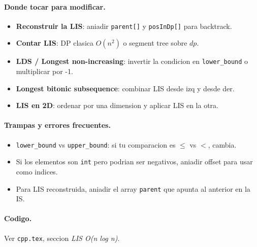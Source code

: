 \paragraph{Donde tocar para modificar.}
\begin{itemize}\setlength\itemsep{0pt}
	\item \textbf{Reconstruir la LIS}: aniadir \texttt{parent[]} y \texttt{posInDp[]} para backtrack.
	\item \textbf{Contar LIS}: DP clasica $O(n^2)$ o segment tree sobre $dp$.
	\item \textbf{LDS / Longest non-increasing}: invertir la condicion en \texttt{lower\_bound} o multiplicar por -1.
	\item \textbf{Longest bitonic subsequence}: combinar LIS desde izq y desde der.
	\item \textbf{LIS en 2D}: ordenar por una dimension y aplicar LIS en la otra.
\end{itemize}

\paragraph{Trampas y errores frecuentes.}
\begin{itemize}\setlength\itemsep{0pt}
	\item \texttt{lower\_bound} vs \texttt{upper\_bound}: si tu comparacion es $\le$ vs $<$, cambia.
	\item Si los elementos son \texttt{int} pero podrian ser negativos, aniadir offset para usar como indices.
	\item Para LIS reconstruida, aniadir el array \texttt{parent} que apunta al anterior en la IS.
\end{itemize}

\paragraph{Codigo.}
Ver \texttt{cpp.tex}, seccion \textit{LIS O(n log n)}.

\vspace{0.5em}
